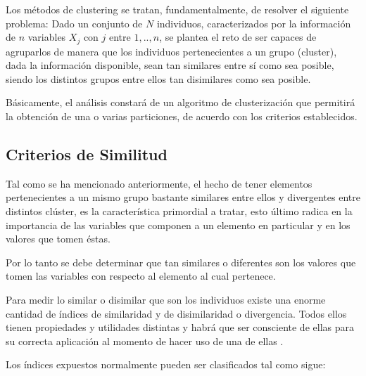 Los métodos de clustering se tratan, fundamentalmente, de resolver el siguiente problema: Dado un conjunto de $N$ individuos, caracterizados por la información de $n$ variables $X_{j}$ con $j$ entre $1,..,n$, se plantea el reto de ser capaces de agruparlos de manera que los individuos pertenecientes a un grupo (cluster), dada la información disponible, sean tan similares entre sí como sea posible, siendo los distintos grupos entre ellos tan disimilares como sea posible.

Básicamente, el análisis constará de un algoritmo de clusterización que permitirá la obtención de una o varias particiones, de acuerdo con los criterios establecidos.

\subsection{Criterios de Similitud}

Tal como se ha mencionado anteriormente, el hecho de tener elementos pertenecientes a un mismo grupo bastante similares entre ellos y divergentes entre distintos clúster, es la característica primordial a tratar, esto último radica en la importancia de las variables que componen a un elemento en particular y en los valores que tomen éstas.

Por lo tanto se debe determinar que tan similares o diferentes son los valores que tomen las variables con respecto al elemento al cual pertenece.

Para medir lo similar o disimilar que son los individuos existe una enorme cantidad de índices de similaridad y de disimilaridad o divergencia. Todos ellos tienen propiedades y utilidades distintas y habrá que ser consciente de ellas para su correcta aplicación al momento de hacer uso de una de ellas \cite{jain1999data}.

Los índices expuestos normalmente pueden ser clasificados tal como sigue:

